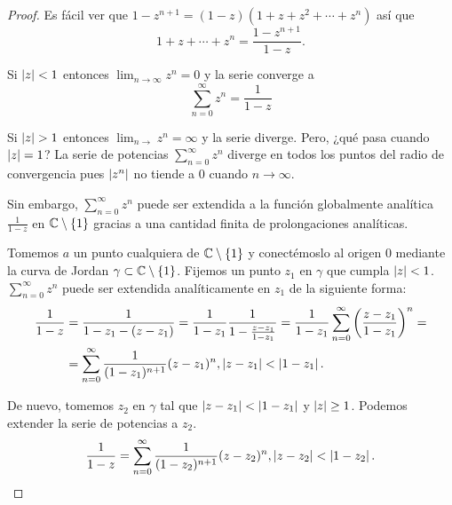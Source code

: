 \begin{proof}
Es fácil ver que $1 - z^{n+1} = (1 - z) (1+ z + z^2 + \cdots + z^n)$ así que
\begin{equation}
    1 + z + \cdots + z^n = \frac{1 - z^{n+1}}{1-z}.
\end{equation}

Si $\left\lvert z\right\rvert < 1$ entonces $\lim_{n \rightarrow \infty} z^n = 0$ y la serie converge a
\begin{equation*}
    \sum_{n=0}^{\infty} z^n = \frac{1}{1 - z}
\end{equation*}

Si $\left\lvert z\right\rvert > 1$ entonces $\lim_{n \rightarrow} z^n = \infty$ y la serie diverge. Pero, ¿qué pasa cuando $\left\lvert z\right\rvert = 1$? La serie de potencias $\sum_{n=0}^{\infty} z^n$ diverge en todos los puntos del radio de convergencia pues $\left\lvert z^n\right\rvert$ no tiende a 0 cuando $n \rightarrow \infty$.

Sin embargo, $\sum_{n=0}^{\infty} z^n$ puede ser extendida a la función globalmente analítica $\frac{1}{1-z}$ en $\mathbb{C} \setminus \{1\}$ gracias a una cantidad finita de prolongaciones analíticas.

Tomemos $a$ un punto cualquiera de $\mathbb{C} \setminus \{1\}$ y conectémoslo al origen $0$ mediante la curva de Jordan $\gamma \subset \mathbb{C} \setminus \{1\}$. Fijemos un punto $z_1$ en $\gamma$ que cumpla $\left\lvert z\right\rvert < 1$. $\sum_{n=0}^{\infty} z^n$ puede ser extendida analíticamente en $z_1$ de la siguiente forma:
\begin{equation*}
    \begin{split}
        \frac{1}{1-z} & = \frac{1}{1 - z_1 - (z - z_1)} = \frac{1}{1 - z_1} \frac{1}{1 - \frac{z - z_1}{1 - z_1}} = \frac{1}{1 - z_1} \sum_{n=0}^{\infty} \left(\frac{z - z_1}{1 - z_1} \right)^n = \\
                      & = \sum_{n=0}^{\infty}  \frac{1}{(1 - z_1)^{n+1}} (z - z_1)^n, \left\lvert z - z_1\right\rvert < \left\lvert1 - z_1\right\rvert.
    \end{split}
\end{equation*}

De nuevo, tomemos $z_2$ en $\gamma$ tal que $\left\lvert z - z_1\right\rvert < \left\lvert1 - z_1\right\rvert$ y $\left\lvert z\right\rvert \geq 1$. Podemos extender la serie de potencias a $z_2$.
\begin{equation*}
    \frac{1}{1-z} = \sum_{n=0}^{\infty} \frac{1}{(1 - z_2)^{n+1}} (z - z_2)^n , \left\lvert z - z_2\right\rvert < \left\lvert1 - z_2\right\rvert.
\end{equation*}



\end{proof}
